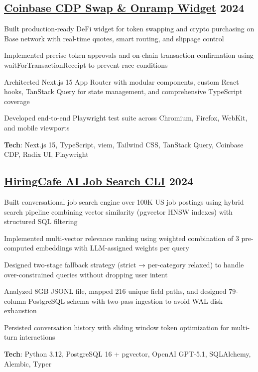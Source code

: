 \documentclass[letter,10pt]{article}
\begin{document}
\subsection{{ \href{https://github.com/Suhel-Kap/coinbase-swap-widget}{Coinbase CDP Swap & Onramp Widget} \hfill 2024}}
\begin{zitemize}
  \item Built production-ready DeFi widget for token swapping and crypto purchasing on Base network with real-time quotes, smart routing, and slippage control
  \item Implemented precise token approvals and on-chain transaction confirmation using waitForTransactionReceipt to prevent race conditions
  \item Architected Next.js 15 App Router with modular components, custom React hooks, TanStack Query for state management, and comprehensive TypeScript coverage
  \item Developed end-to-end Playwright test suite across Chromium, Firefox, WebKit, and mobile viewports
  \item \textbf{Tech}: Next.js 15, TypeScript, viem, Tailwind CSS, TanStack Query, Coinbase CDP, Radix UI, Playwright
\end{zitemize}

\subsection{{ \href{https://github.com/Suhel-Kap/hiringcafe-dataset-job-search}{HiringCafe AI Job Search CLI} \hfill 2024}}
\begin{zitemize}
  \item Built conversational job search engine over 100K US job postings using hybrid search pipeline combining vector similarity (pgvector HNSW indexes) with structured SQL filtering
  \item Implemented multi-vector relevance ranking using weighted combination of 3 pre-computed embeddings with LLM-assigned weights per query
  \item Designed two-stage fallback strategy (strict → per-category relaxed) to handle over-constrained queries without dropping user intent
  \item Analyzed 8GB JSONL file, mapped 216 unique field paths, and designed 79-column PostgreSQL schema with two-pass ingestion to avoid WAL disk exhaustion
  \item Persisted conversation history with sliding window token optimization for multi-turn interactions
  \item \textbf{Tech}: Python 3.12, PostgreSQL 16 + pgvector, OpenAI GPT-5.1, SQLAlchemy, Alembic, Typer
\end{zitemize}
\end{document}

